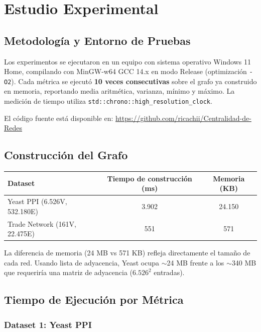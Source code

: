 \section{Estudio Experimental}

\subsection{Metodología y Entorno de Pruebas}

Los experimentos se ejecutaron en un equipo con sistema operativo Windows 11 Home,
compilando con MinGW-w64 GCC 14.x en modo Release (optimización \texttt{-O2}).
Cada métrica se ejecutó \textbf{10 veces consecutivas} sobre el grafo ya construido
en memoria, reportando media aritmética, varianza, mínimo y máximo. La medición de
tiempo utiliza \texttt{std::chrono::high\_resolution\_clock}.

El código fuente está disponible en:
\url{https://github.com/ricachii/Centralidad-de-Redes}

\subsection{Construcción del Grafo}

\begin{center}
\begin{tabular}{lcc}
\toprule
\textbf{Dataset} & \textbf{Tiempo de construcción (ms)} & \textbf{Memoria (KB)} \\
\midrule
Yeast PPI (6.526V, 532.180E) & 3.902 & 24.150 \\
Trade Network (161V, 22.475E) & 551 & 571 \\
\bottomrule
\end{tabular}
\end{center}

La diferencia de memoria (24 MB vs 571 KB) refleja directamente el tamaño de cada red.
Usando lista de adyacencia, Yeast ocupa $\sim$24 MB frente a los $\sim$340 MB que
requeriría una matriz de adyacencia ($6.526^2$ entradas).

\subsection{Tiempo de Ejecución por Métrica}

\subsubsection*{Dataset 1: Yeast PPI}

